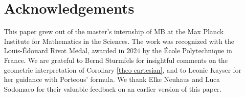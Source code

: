 \documentclass[11pt]{amsart}
\numberwithin{equation}{section}
\theoremstyle{plain}
\numberwithin{theorem}{section}
\theoremstyle{definition}
\begin{document}
\section*{Acknowledgements} 
This paper grew out of the master's internship of MB at the Max Planck Institute for Mathematics in the Sciences. The work was recognized with the Louis-\'{E}douard Rivot Medal, awarded in 2024 by the \'{E}cole Polytechnique in France. We are grateful to Bernd Sturmfels for insightful comments on the geometric interpretation of Corollary \ref{theo cartesian}, and to Leonie Kayser for her guidance with Porteous' formula. We thank Elke Neuhaus and Luca Sodomaco for their valuable feedback on an earlier version of this paper.


\end{document}
